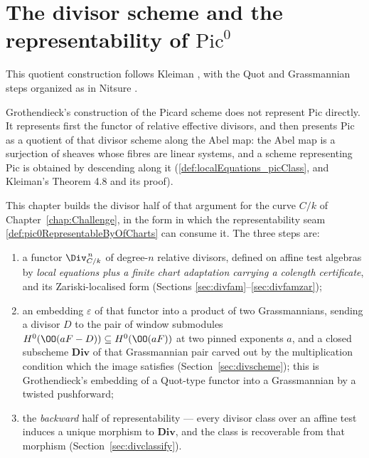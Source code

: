 \chapter{The divisor scheme and the representability of \(\mathrm{Pic}^0\)}
\label{chap:DivisorScheme}

This quotient construction follows Kleiman \cite{kleiman-picard}, with the Quot and
Grassmannian steps organized as in Nitsure \cite{nitsure-hilbert-quot}.

Grothendieck's construction of the Picard scheme does not represent \(\mathrm{Pic}\)
directly. It represents first the functor of relative effective divisors, and then
presents \(\mathrm{Pic}\) as a quotient of that divisor scheme along the Abel map: the
Abel map is a surjection of sheaves whose fibres are linear systems, and a scheme
representing \(\mathrm{Pic}\) is obtained by descending along it
(\ref{def:localEquations_picClass}, and Kleiman's Theorem 4.8 and its proof).

This chapter builds the divisor half of that argument for the curve \(C/k\) of
Chapter~\ref{chap:Challenge}, in the form in which the representability seam
\ref{def:pic0RepresentableByOfCharts} can consume it. The three steps are:

\begin{enumerate}
  \item a functor \(\Div^{\,n}_{C/k}\) of degree-\(n\) relative divisors, defined on affine
    test algebras by \emph{local equations plus a finite chart adaptation carrying a
    colength certificate}, and its Zariski-localised form (Sections
    \ref{sec:divfam}--\ref{sec:divfamzar});
  \item an embedding \(\varepsilon\) of that functor into a product of two Grassmannians,
    sending a divisor \(D\) to the pair of window submodules
    \(H^0(\OO(aF - D)) \subseteq H^0(\OO(aF))\) at two pinned exponents \(a\), and a closed
    subscheme \(\mathbf{Div}\) of that Grassmannian pair carved out by the multiplication
    condition which the image satisfies (Section~\ref{sec:divscheme}); this is
    Grothendieck's embedding of a Quot-type functor into a Grassmannian by a twisted
    pushforward;
  \item the \emph{backward} half of representability --- every divisor class over an affine
    test induces a unique morphism to \(\mathbf{Div}\), and the class is recoverable from
    that morphism (Section~\ref{sec:divclassify}).
\end{enumerate}

